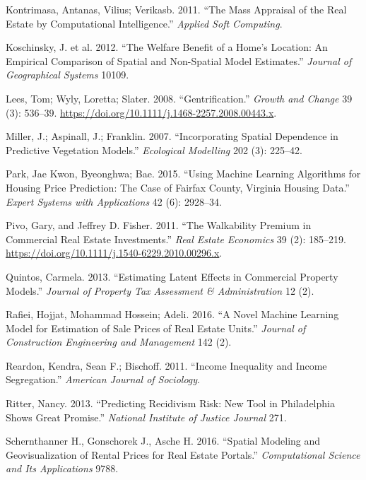 \documentclass[12pt,]{article}
\begin{document}
\leavevmode\hypertarget{ref-Kontrimasa2011}{}%
Kontrimasa, Antanas, Vilius; Verikasb. 2011. ``The Mass Appraisal of the
Real Estate by Computational Intelligence.'' \emph{Applied Soft
Computing}.

\leavevmode\hypertarget{ref-Koschinsky2012}{}%
Koschinsky, J. et al. 2012. ``The Welfare Benefit of a Home's Location:
An Empirical Comparison of Spatial and Non-Spatial Model Estimates.''
\emph{Journal of Geographical Systems} 10109.

\leavevmode\hypertarget{ref-Lees2008}{}%
Lees, Tom; Wyly, Loretta; Slater. 2008. ``Gentrification.'' \emph{Growth
and Change} 39 (3): 536--39.
\url{https://doi.org/10.1111/j.1468-2257.2008.00443.x}.

\leavevmode\hypertarget{ref-Miller2015}{}%
Miller, J.; Aspinall, J.; Franklin. 2007. ``Incorporating Spatial
Dependence in Predictive Vegetation Models.'' \emph{Ecological
Modelling} 202 (3): 225--42.

\leavevmode\hypertarget{ref-Park2015}{}%
Park, Jae Kwon, Byeonghwa; Bae. 2015. ``Using Machine Learning
Algorithms for Housing Price Prediction: The Case of Fairfax County,
Virginia Housing Data.'' \emph{Expert Systems with Applications} 42 (6):
2928--34.

\leavevmode\hypertarget{ref-Pivo2011}{}%
Pivo, Gary, and Jeffrey D. Fisher. 2011. ``The Walkability Premium in
Commercial Real Estate Investments.'' \emph{Real Estate Economics} 39
(2): 185--219. \url{https://doi.org/10.1111/j.1540-6229.2010.00296.x}.

\leavevmode\hypertarget{ref-Quintos2013}{}%
Quintos, Carmela. 2013. ``Estimating Latent Effects in Commercial
Property Models.'' \emph{Journal of Property Tax Assessment \&
Administration} 12 (2).

\leavevmode\hypertarget{ref-Rafiei2016}{}%
Rafiei, Hojjat, Mohammad Hossein; Adeli. 2016. ``A Novel Machine
Learning Model for Estimation of Sale Prices of Real Estate Units.''
\emph{Journal of Construction Engineering and Management} 142 (2).

\leavevmode\hypertarget{ref-Reardon2011}{}%
Reardon, Kendra, Sean F.; Bischoff. 2011. ``Income Inequality and Income
Segregation.'' \emph{American Journal of Sociology}.

\leavevmode\hypertarget{ref-Ritter2013}{}%
Ritter, Nancy. 2013. ``Predicting Recidivism Risk: New Tool in
Philadelphia Shows Great Promise.'' \emph{National Institute of Justice
Journal} 271.

\leavevmode\hypertarget{ref-Schernthanner2016}{}%
Schernthanner H., Gonschorek J., Asche H. 2016. ``Spatial Modeling and
Geovisualization of Rental Prices for Real Estate Portals.''
\emph{Computational Science and Its Applications} 9788.
\end{document}
